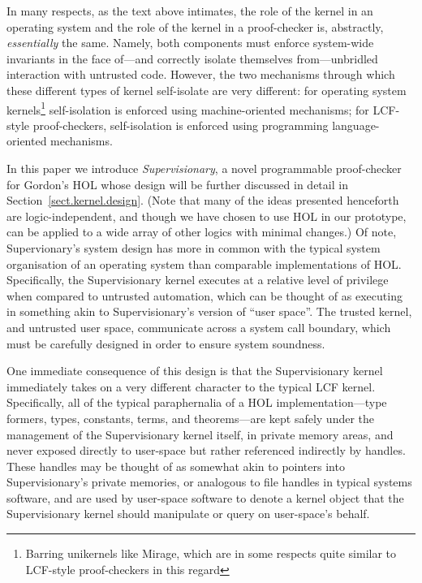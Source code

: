 \documentclass[a4paper, UKenglish, cleveref, autoref, thm-restate]{lipics-v2021}
\begin{document}
In many respects, as the text above intimates, the role of the kernel in an operating system and the role of the kernel in a proof-checker is, abstractly, \emph{essentially} the same.
Namely, both components must enforce system-wide invariants in the face of---and correctly isolate themselves from---unbridled interaction with untrusted code.
However, the two mechanisms through which these different types of kernel self-isolate are very different: for operating system kernels\footnote{Barring unikernels like Mirage, which are in some respects quite similar to LCF-style proof-checkers in this regard} self-isolation is enforced using machine-oriented mechanisms; for LCF-style proof-checkers, self-isolation is enforced using programming language-oriented mechanisms.

In this paper we introduce \emph{Supervisionary}, a novel programmable proof-checker for Gordon's HOL whose design will be further discussed in detail in Section~\ref{sect.kernel.design}.
(Note that many of the ideas presented henceforth are logic-independent, and though we have chosen to use HOL in our prototype, can be applied to a wide array of other logics with minimal changes.)
Of note, Supervionary's system design has more in common with the typical system organisation of an operating system than comparable implementations of HOL.
Specifically, the Supervisionary kernel executes at a relative level of privilege when compared to untrusted automation, which can be thought of as executing in something akin to Supervisionary's version of ``user space''.
The trusted kernel, and untrusted user space, communicate across a system call boundary, which must be carefully designed in order to ensure system soundness.

One immediate consequence of this design is that the Supervisionary kernel immediately takes on a very different character to the typical LCF kernel.
Specifically, all of the typical paraphernalia of a HOL implementation---type formers, types, constants, terms, and theorems---are kept safely under the management of the Supervisionary kernel itself, in private memory areas, and never exposed directly to user-space but rather referenced indirectly by handles.
These handles may be thought of as somewhat akin to pointers into Supervisionary's private memories, or analogous to file handles in typical systems software, and are used by user-space software to denote a kernel object that the Supervisionary kernel should manipulate or query on user-space's behalf.
\end{document}
